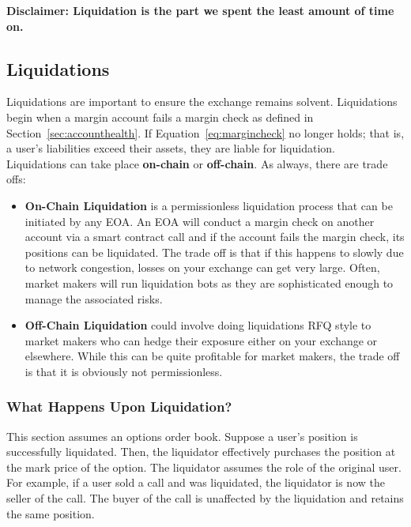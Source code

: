 \documentclass{article}
\begin{document}
\textbf{Disclaimer: Liquidation is the part we spent the least amount of time on.}

\subsection{Liquidations}

\noindent Liquidations are important to ensure the exchange remains solvent. Liquidations begin when a margin account fails a margin check as defined in Section~\ref{sec:accounthealth}. If Equation~\ref{eq:margincheck} no longer holds; that is, a user's liabilities exceed their assets, they are liable for liquidation.\\

\noindent Liquidations can take place \textbf{on-chain} or \textbf{off-chain}. As always, there are trade offs:
\begin{itemize}
    \item \textbf{On-Chain Liquidation} is a permissionless liquidation process that can be initiated by any EOA. An EOA will conduct a margin check on another account via a smart contract call and if the account fails the margin check, its positions can be liquidated. The trade off is that if this happens to slowly due to network congestion, losses on your exchange can get very large. Often, market makers will run liquidation bots as they are sophisticated enough to manage the associated risks. 
    \item \textbf{Off-Chain Liquidation} could involve doing liquidations RFQ style to market makers who can hedge their exposure either on your exchange or elsewhere. While this can be quite profitable for market makers, the trade off is that it is obviously not permissionless.
    
\end{itemize}


\subsubsection{What Happens Upon Liquidation?}

This section assumes an options order book. Suppose a user's position is successfully liquidated. Then, the liquidator effectively purchases the position at the mark price of the option. The liquidator assumes the role of the original user. For example, if a user sold a call and was liquidated, the liquidator is now the seller of the call. The buyer of the call is unaffected by the liquidation and retains the same position.\\
\end{document}
